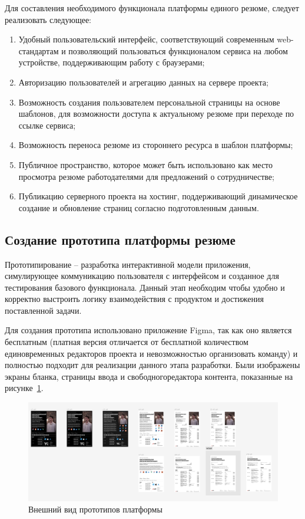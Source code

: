 \documentclass[master, och, diploma]{SCWorks}
\begin{document}
Для составления необходимого функционала платформы единого резюме, следует реализовать следующее:
\begin{enumerate}
    \item Удобный пользовательский интерфейс, соответствующий современным web-стандартам 
    и позволяющий пользоваться функционалом сервиса на любом устройстве, поддерживающим 
    работу с браузерами;
    \item Авторизацию пользователей и агрегацию данных на сервере проекта;
    \item Возможность создания пользователем персональной страницы на основе шаблонов, 
    для возможности доступа к актуальному резюме при переходе по ссылке сервиса;
    \item Возможность переноса резюме из стороннего ресурса в шаблон платформы;
    \item Публичное пространство, которое может быть использовано как место просмотра 
    резюме работодателями для предложений о сотрудничестве;
    \item Публикацию серверного проекта на хостинг, поддерживающий динамическое 
    создание и обновление страниц согласно подготовленным данным.
\end{enumerate}



\subsection{Создание прототипа платформы резюме}
Прототипирование – разработка интерактивной модели приложения, симулирующее коммуникацию пользователя с интерфейсом и созданное для тестирования базового функционала. Данный этап необходим чтобы удобно и корректно выстроить логику взаимодействия с продуктом и достижения поставленной задачи.

Для создания прототипа использовано приложение Figma, так как оно является бесплатным (платная версия отличается от бесплатной количеством единовременных редакторов проекта и невозможностью организовать команду) и полностью подходит для реализации данного этапа разработки. Были изображены экраны бланка, страницы ввода и свободногоредактора контента, показанные на рисунке~\ref{fig:21}.

\begin{figure}[!ht]
    \centering
    \includegraphics[width=12cm]{images/image21.png}
    \caption{\label{fig:21}%
        Внешний вид прототипов платформы}
\end{figure}
\end{document}
